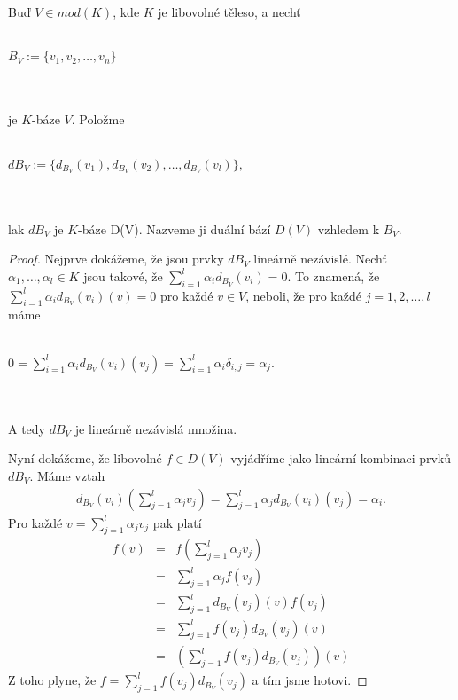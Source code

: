      \begin{lem}
       Buď $V\in mod(K)$, kde $K$ je libovolné těleso, a nechť \\\\
       \centerline{$B_V:=\{v_1,v_2,\ldots,v_n\}$}\\\\
       je $K$-báze $V$. Položme \\\\
       \centerline{$dB_V:=\{d_{B_V}(v_1),d_{B_V}(v_2),\ldots,d_{B_V}(v_l)\},$}  \\\\
       lak $dB_V$ je $K$-báze D(V).  Nazveme ji duální bází $D(V)$ 
       vzhledem k $B_V$.
     \end{lem}
     
     \begin{proof}
       Nejprve dokážeme, že jsou prvky $dB_V$ lineárně nezávislé. 
       Nechť $\alpha_1,\ldots,\alpha_l \in K$ jsou takové, že 
       $\sum_{i=1}^l \alpha_i d_{B_V}(v_i)=0$. To znamená, že 
       $\sum_{i=1}^l \alpha_i d_{B_V}(v_i)(v)=0$ pro každé $v\in V$, neboli,  že 
       pro každé $j=1,2,\ldots,l$ máme \\\\
       \centerline{$0
         =\sum_{i=1}^l \alpha_i d_{B_V}(v_i)(v_j)
         =\sum_{i=1}^l \alpha_i \delta_{i,j}
         =\alpha_j$.} \\\\
       A tedy $dB_V$ je lineárně nezávislá množina.
       
       Nyní dokážeme, že libovolné $f\in D(V)$ vyjádříme jako lineární kombinaci 
       prvků $dB_V$. Máme vztah 
       \begin{eqnarray}
         d_{B_V}(v_i)\left(\sum_{j=1}^l\alpha_jv_j\right)
         =\sum_{j=1}^l\alpha_jd_{B_V}(v_i)(v_j)       
         =\alpha_i.  \nonumber          
       \end{eqnarray}
       Pro každé $v=\sum_{j=1}^l\alpha_jv_j$ pak platí
       \begin{eqnarray}
         f(v)
         &=& f\left(\sum_{j=1}^l\alpha_jv_j\right)  \nonumber \\        
         &=& \sum_{j=1}^l\alpha_j f(v_j)  \nonumber \\        
         &=& \sum_{j=1}^l d_{B_V}(v_j)(v) f(v_j)  \nonumber \\     
         &=& \sum_{j=1}^l f(v_j) d_{B_V}(v_j)(v)  \nonumber \\              
         &=& \left( \sum_{j=1}^l f(v_j) d_{B_V}(v_j) \right)(v) \nonumber         
       \end{eqnarray}
       Z toho plyne, že $f=\sum_{j=1}^l f(v_j) d_{B_V}(v_j)$ a tím jsme hotovi.
     \end{proof}
     

